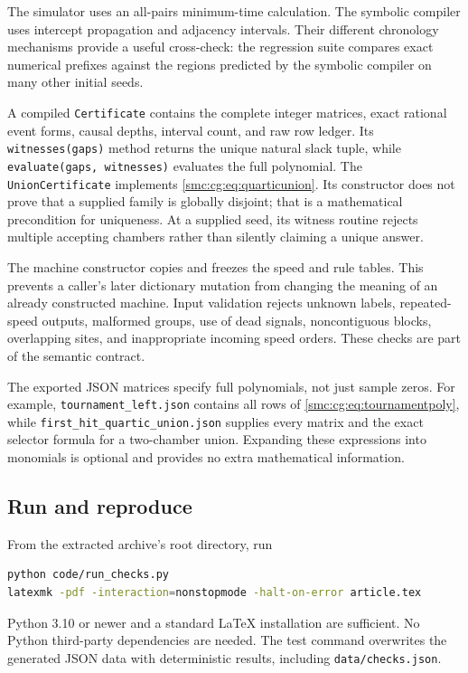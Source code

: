\documentclass[11pt,letterpaper]{article}
\numberwithin{equation}{section}
\theoremstyle{definition}
\theoremstyle{remark}
\begin{document}
The simulator uses an all-pairs minimum-time calculation. The symbolic
compiler uses intercept propagation and adjacency intervals. Their different
chronology mechanisms provide a useful cross-check: the regression suite
compares exact numerical prefixes against the regions predicted by the
symbolic compiler on many other initial seeds.

A compiled \texttt{Certificate} contains the complete integer matrices,
exact rational event forms, causal depths, interval count, and raw row
ledger. Its \texttt{witnesses(gaps)} method returns the unique natural slack
tuple, while \texttt{evaluate(gaps, witnesses)} evaluates the full polynomial.
The \texttt{UnionCertificate} implements \eqref{smc:cg:eq:quarticunion}. Its
constructor does not prove that a supplied family is globally disjoint;
that is a mathematical precondition for uniqueness. At a supplied seed,
its witness routine rejects multiple accepting chambers rather than
silently claiming a unique answer.

The machine constructor copies and freezes the speed and rule tables.
This prevents a caller's later dictionary mutation from changing the
meaning of an already constructed machine. Input validation rejects unknown
labels, repeated-speed outputs, malformed groups, use of dead signals,
noncontiguous blocks, overlapping sites, and inappropriate incoming speed
orders. These checks are part of the semantic contract.

The exported JSON matrices specify full polynomials, not just sample zeros.
For example, \texttt{tournament\_left.json} contains all rows of
\eqref{smc:cg:eq:tournamentpoly}, while
\texttt{first\_hit\_quartic\_union.json} supplies every matrix and the exact
selector formula for a two-chamber union. Expanding these expressions into
monomials is optional and provides no extra mathematical information.

\subsection{Run and reproduce}

From the extracted archive's root directory, run
\begin{lstlisting}[language=bash]
python code/run_checks.py
latexmk -pdf -interaction=nonstopmode -halt-on-error article.tex
\end{lstlisting}
Python 3.10 or newer and a standard LaTeX installation are sufficient.
No Python third-party dependencies are needed. The test command overwrites
the generated JSON data with deterministic results, including
\texttt{data/checks.json}.
\end{document}
